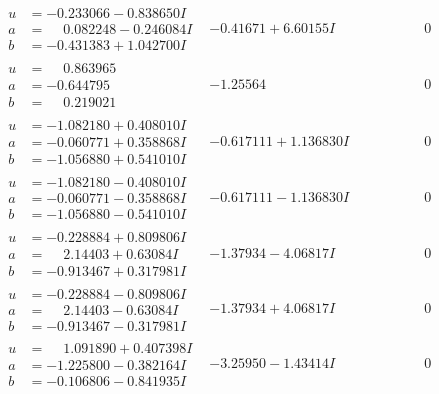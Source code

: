 \documentclass[1p]{elsarticle_modified}
\theoremstyle{definition}
\begin{document}
$$\begin{array}{c|c|c}
\begin{aligned}
u &= -0.233066 - 0.838650 I \\
a &= \phantom{-}0.082248 - 0.246084 I \\
b &= -0.431383 + 1.042700 I\end{aligned}
 & -0.41671 + 6.60155 I & \phantom{-0.000000 } 0 \\ \hline\begin{aligned}
u &= \phantom{-}0.863965\phantom{ +0.000000I} \\
a &= -0.644795\phantom{ +0.000000I} \\
b &= \phantom{-}0.219021\phantom{ +0.000000I}\end{aligned}
 & -1.25564\phantom{ +0.000000I} & \phantom{-0.000000 } 0 \\ \hline\begin{aligned}
u &= -1.082180 + 0.408010 I \\
a &= -0.060771 + 0.358868 I \\
b &= -1.056880 + 0.541010 I\end{aligned}
 & -0.617111 + 1.136830 I & \phantom{-0.000000 } 0 \\ \hline\begin{aligned}
u &= -1.082180 - 0.408010 I \\
a &= -0.060771 - 0.358868 I \\
b &= -1.056880 - 0.541010 I\end{aligned}
 & -0.617111 - 1.136830 I & \phantom{-0.000000 } 0 \\ \hline\begin{aligned}
u &= -0.228884 + 0.809806 I \\
a &= \phantom{-}2.14403 + 0.63084 I \\
b &= -0.913467 + 0.317981 I\end{aligned}
 & -1.37934 - 4.06817 I & \phantom{-0.000000 } 0 \\ \hline\begin{aligned}
u &= -0.228884 - 0.809806 I \\
a &= \phantom{-}2.14403 - 0.63084 I \\
b &= -0.913467 - 0.317981 I\end{aligned}
 & -1.37934 + 4.06817 I & \phantom{-0.000000 } 0 \\ \hline\begin{aligned}
u &= \phantom{-}1.091890 + 0.407398 I \\
a &= -1.225800 - 0.382164 I \\
b &= -0.106806 - 0.841935 I\end{aligned}
 & -3.25950 - 1.43414 I & \phantom{-0.000000 } 0 \\ \hline\begin{aligned}

\end{aligned}
\end{array}$$
\end{document}
